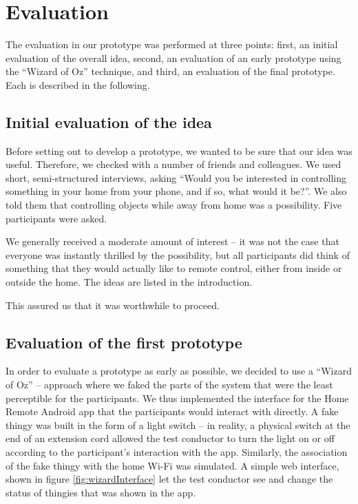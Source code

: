 \documentclass{ubicomp2012}
\begin{document}
\section{Evaluation}

The evaluation in our prototype was performed at three points: first, an initial evaluation of the overall idea, second, an evaluation of an early prototype using the ``Wizard of Oz'' technique, and third, an evaluation of the final prototype. Each is described in the following.
\subsection{Initial evaluation of the idea}

Before setting out to develop a prototype, we wanted to be sure that our idea was useful. Therefore, we checked with a number of friends and colleagues. We used short, semi-structured interviews, asking ``Would you be interested in controlling something in your home from your phone, and if so, what would it be?''. We also told them that controlling objects while away from home was a possibility. Five participants were asked.

We generally received a moderate amount of interest -- it was not the case that everyone was instantly thrilled by the possibility, but all participants did think of something that they would actually like to remote control, either from inside or outside the home. The ideas are listed in the introduction.

This assured us that it was worthwhile to proceed.
\subsection{Evaluation of the first prototype}

In order to evaluate a prototype as early as possible, we decided to use a ``Wizard of Oz'' -- approach where we faked the parts of the system that were the least perceptible for the participants. We thus implemented the interface for the Home Remote Android app that the participants would interact with directly. A fake thingy was built in the form of a light switch -- in reality, a physical switch at the end of an extension cord allowed the test conductor to turn the light on or off according to the participant's interaction with the app. Similarly, the association of the fake thingy with the home Wi-Fi was simulated. A simple web interface, shown in figure \ref{fig:wizardInterface} let the test conductor see and change the status of thingies that was shown in the app.
\end{document}

